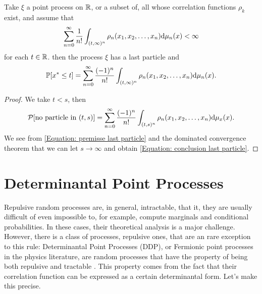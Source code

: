 \begin{prop}
	Take $\xi$ a point process on $\mathbb{R}$, or a subset of, all whose correlation functions $\rho_k$ exist, and assume that
	\begin{equation}
		\sum_{n=0}^{\infty} \frac{1}{n!} \int_{(t, \infty)^n} \rho_n(x_1, x_2, \dots, x_n) \mathrm{d} \mu_n(x) < \infty
		\label{Equation: premisse last particle}
	\end{equation}
	for each $t \in \mathbb{R}$. then the process $\xi$ has a last particle and 
	\begin{equation}
		\mathbb{P}[x^* \leq t] = \sum_{n=0}^{\infty} \frac{(-1)^n}{n!} \int_{(t,\infty)^n} \rho_n(x_1, x_2, \dots, x_n) \mathrm{d} \mu_n(x) .
		\label{Equation: conclusion last particle}
	\end{equation}
\end{prop}
\begin{proof}
	We take $t < s$, then
	\begin{equation}
		\mathcal{P}[\text{no particle in} \ (t, s)] = \sum_{n=0}^{\infty} \frac{(-1)^n}{n!} \int_{(t, s)^n} \rho_n(x_1, x_2, \dots, x_n) \mathrm{d} \mu_x(x).
	\end{equation}
	We see from \eqref{Equation: premisse last particle} and the dominated convergence theorem that we can let $s \rightarrow \infty$ and obtain \eqref{Equation: conclusion last particle}.
\end{proof}


\section{Determinantal Point Processes}

Repulsive random processes are, in general, intractable, that it, they are usually difficult of even impossible to, for example, compute marginals and conditional probabilities. In these cases, their theoretical analysis is a major challenge. However, there is a class of processes, repulsive ones, that are an rare exception to this rule: Determinantal Point Processes (DDP), or Fermionic point processes in the physics literature, are random processes that have the property of being both repulsive and tractable \cite{Tremblay}. This property comes from the fact that their correlation function can be expressed as a certain determinantal form. Let's make this precise.

